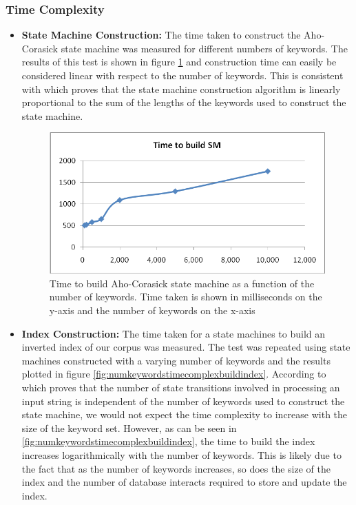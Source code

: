 \documentclass[10pt]{report}
\begin{document}
\subsubsection{Time Complexity}
\begin{itemize}
\item \textbf{State Machine Construction:}
  The time taken to construct the Aho-Corasick state machine was
  measured for different numbers of keywords. The results of this test
  is shown in figure \ref{fig:numkeywordstimecomplexbuildsm} and construction time
  can easily be considered linear with respect to the number of
  keywords. This is consistent with \cite{RefWorks:103} which proves
  that the state machine construction algorithm is linearly
  proportional to the sum of the lengths of the keywords used to
  construct the state machine.

  \begin{figure}[h]
    \begin{center}
      \includegraphics[width=\textwidth,height=!]{numkeywordstimecomplexbuildsm}
    \end{center}
    \caption{Time to build Aho-Corasick state machine as a function of
      the number of keywords. Time taken is shown in milliseconds on the
      y-axis and the number of keywords on the x-axis}
    \label{fig:numkeywordstimecomplexbuildsm}
  \end{figure} 
  
\item \textbf{Index Construction:} 
  The time taken for a state machines to build an inverted index of our
  corpus was measured. The test was repeated using state machines
  constructed with a varying number of keywords and the results plotted
  in figure \ref{fig:numkeywordstimecomplexbuildindex}. According to
  \cite{RefWorks:103} which proves that the number of state transitions
  involved in processing an input string is independent of the number of
  keywords used to construct the state machine, we would not expect the
  time complexity to increase with the size of the keyword set. However,
  as can be seen in \ref{fig:numkeywordstimecomplexbuildindex}, the time
  to build the index increases logarithmically with the number of
  keywords. This is likely due to the fact that as the number of keywords
  increases, so does the size of the index and the number of database
  interacts required to store and update the index.


\end{itemize}
\end{document}

